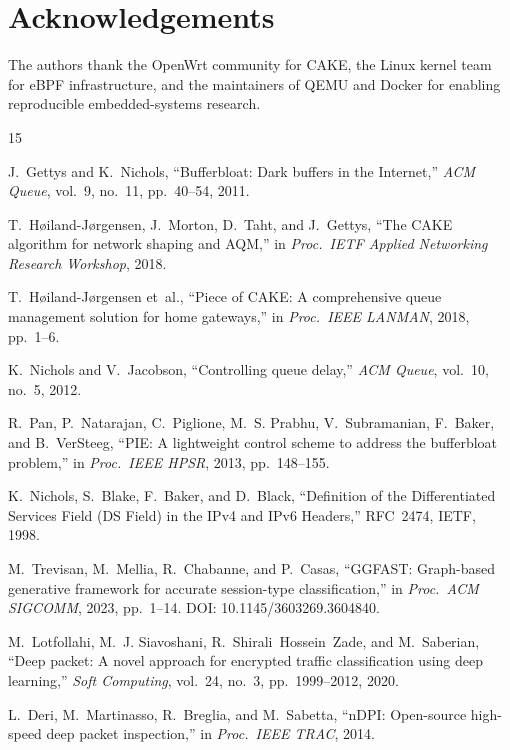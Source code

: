 \documentclass[conference]{IEEEtran}
\begin{document}
\section*{Acknowledgements}
The authors thank the OpenWrt community for CAKE, the Linux kernel team for
eBPF infrastructure, and the maintainers of QEMU and Docker for enabling
reproducible embedded-systems research.

\begin{thebibliography}{15}

J.~Gettys and K.~Nichols,
``Bufferbloat: Dark buffers in the Internet,''
\emph{ACM Queue}, vol.~9, no.~11, pp.~40--54, 2011.

T.~Høiland-Jørgensen, J.~Morton, D.~Taht, and J.~Gettys,
``The CAKE algorithm for network shaping and AQM,''
in \emph{Proc.\ IETF Applied Networking Research Workshop}, 2018.

T.~Høiland-Jørgensen et~al.,
``Piece of CAKE: A comprehensive queue management solution for home gateways,''
in \emph{Proc.\ IEEE LANMAN}, 2018, pp.~1--6.

K.~Nichols and V.~Jacobson,
``Controlling queue delay,''
\emph{ACM Queue}, vol.~10, no.~5, 2012.

R.~Pan, P.~Natarajan, C.~Piglione, M.~S. Prabhu, V.~Subramanian, F.~Baker,
and B.~VerSteeg,
``PIE: A lightweight control scheme to address the bufferbloat problem,''
in \emph{Proc.\ IEEE HPSR}, 2013, pp.~148--155.

K.~Nichols, S.~Blake, F.~Baker, and D.~Black,
``Definition of the Differentiated Services Field (DS Field) in the IPv4 and
IPv6 Headers,'' RFC~2474, IETF, 1998.

M.~Trevisan, M.~Mellia, R.~Chabanne, and P.~Casas,
``GGFAST: Graph-based generative framework for accurate session-type
classification,''
in \emph{Proc.\ ACM SIGCOMM}, 2023, pp.~1--14.
DOI: 10.1145/3603269.3604840.

M.~Lotfollahi, M.~J. Siavoshani, R.~Shirali~Hossein~Zade, and M.~Saberian,
``Deep packet: A novel approach for encrypted traffic classification using
deep learning,''
\emph{Soft Computing}, vol.~24, no.~3, pp.~1999--2012, 2020.

L.~Deri, M.~Martinasso, R.~Breglia, and M.~Sabetta,
``nDPI: Open-source high-speed deep packet inspection,''
in \emph{Proc.\ IEEE TRAC}, 2014.


\end{thebibliography}
\end{document}
